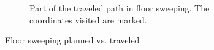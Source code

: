 \begin{figure}[ht]
\begin{subfigure}[t]{0.3\textwidth}
    \caption{Part of the traveled path in floor sweeping. The coordinates visited are marked.}
    \label{floor_sweep_robot}
  \end{subfigure}
\caption{Floor sweeping planned vs. traveled}
\label{floor_sweeping_results}
\end{figure}